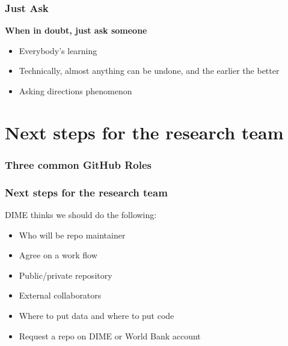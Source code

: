 \documentclass[aspectratio=169]{beamer} %
\begin{document}
\begin{frame}
\frametitle{Just Ask}

	\textbf{When in doubt, just ask someone}

	\vspace{1cm}
	\begin{itemize}
		\item Everybody's learning
		\item Technically, almost anything can be undone, and the earlier the better
		\item Asking directions phenomenon
	\end{itemize}


\end{frame}

\section{Next steps for the research team}

\begin{frame}
\frametitle{Three common GitHub Roles}

	

\end{frame}

\begin{frame}
\frametitle{Next steps for the research team}

	DIME thinks we should do the following:

	\begin{itemize}
		\item Who will be repo maintainer
		\item Agree on a work flow
		\item Public/private repository
		\item External collaborators
		\item Where to put data and where to put code
		\item Request a repo on DIME or World Bank account
	\end{itemize}

\end{frame}



\end{document}
